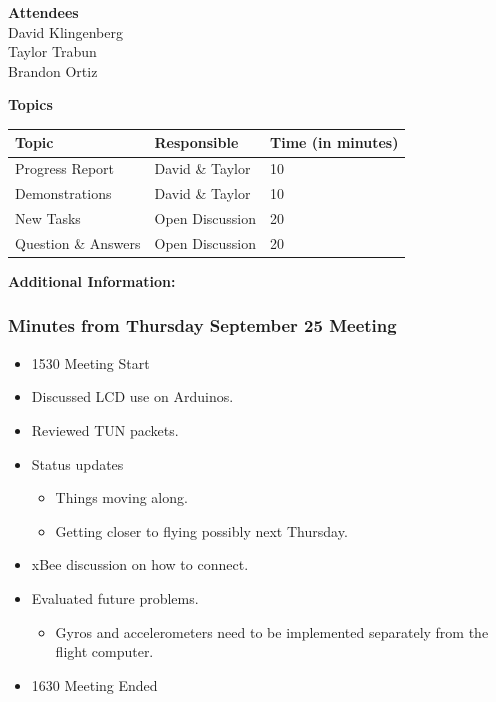\documentclass[pdftex,11pt]{article}
\begin{document}
{ \large \bfseries \hspace*{2 mm} Attendees\\}
\hspace*{12mm} David Klingenberg\\
\hspace*{12mm} Taylor Trabun\\
\hspace*{12mm} Brandon Ortiz\\
\vspace*{1.5mm}

{ \large \bfseries \noindent Topics}
\vspace*{2.5mm}

\begin{tabular}{| l | l | l |}
  \hline
  \bfseries Topic & \bfseries Responsible & \bfseries Time (in minutes) \\ \hline
  Progress Report  & David \& Taylor &  10 \\ \hline
  Demonstrations & David \& Taylor & 10 \\ \hline
  New Tasks & Open Discussion & 20 \\ \hline
  Question \&  Answers  & Open Discussion & 20 \\ 
  \hline
\end{tabular}

\vspace*{2.5mm}
{ \large \bfseries \noindent Additional Information:}

\subsubsection[short]{Minutes from Thursday September 25 Meeting}
\begin{itemize}
	\item 1530 \indent Meeting Start
	\item Discussed LCD use on Arduinos.
	\item Reviewed TUN  packets.
	\item  Status updates
	\begin{itemize}
		\item Things moving along.
		\item Getting closer to flying possibly  next Thursday.
	\end{itemize}
	\item xBee discussion on how to connect.
	\item Evaluated future problems.
	\begin{itemize}
		\item  Gyros and accelerometers need to be implemented separately from the flight computer.
	\end{itemize}
	\item 1630 \indent Meeting Ended
\end{itemize}	
\end{document}
